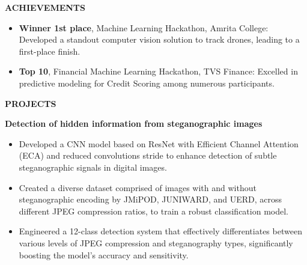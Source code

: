 \documentclass[10pt,a4]{article}
\begin{document}
{\begin{flushleft}
\begin{itemize}
    \end{itemize}

\end{flushleft}


\begin{flushleft}
        {\Large \textbf{ACHIEVEMENTS}}
        \vspace{1.5mm}
        \begin{itemize}
        \item \large \textbf{Winner 1st place}, Machine Learning Hackathon, Amrita College: Developed a standout computer vision
        solution to track drones, leading to a first-place finish.
        \item \large \textbf{Top 10}, Financial Machine Learning Hackathon, TVS Finance: Excelled in predictive modeling for Credit Scoring among numerous participants.
        \end{itemize}
\end{flushleft}

\begin{flushleft}
    {\Large \textbf{PROJECTS}}
    \vspace{1.5mm}
    \item \textbf{\large Detection of hidden information from steganographic images}
        \begin{itemize}
            \item \large Developed a CNN model based on ResNet with Efficient Channel Attention (ECA) and reduced convolutions stride to enhance detection of subtle steganographic signals in digital images.
            \item \large Created a diverse dataset comprised of images with and without steganographic encoding by JMiPOD, JUNIWARD, and UERD, across different JPEG compression ratios, to train a robust classification model.
            \item \large Engineered a 12-class detection system that effectively differentiates between various levels of JPEG compression and steganography types, significantly boosting the model’s accuracy and sensitivity.
        \end{itemize}

\end{flushleft}

}
	
\end{document}
